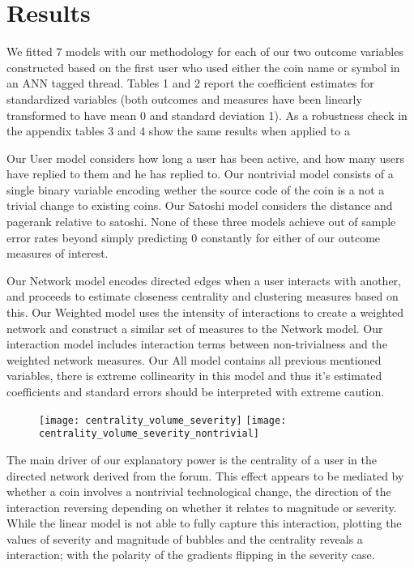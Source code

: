 \section{Results}

We fitted $7$ models with our methodology for each of our two outcome variables constructed based on the first user who used either the coin name or symbol in an ANN tagged thread.
Tables 1 and 2 report the coefficient estimates for standardized variables (both outcomes and measures have been linearly transformed to have mean 0 and standard deviation 1).
As a robustness check in the appendix tables 3 and 4 show the same results when applied to a 

Our User model considers how long a user has been active, and how many users have replied to them and he has replied to. 
Our nontrivial model consists of a single binary variable encoding wether the source code of the coin is a not a trivial change to existing coins. 
Our Satoshi model considers the distance and pagerank relative to satoshi.
None  of these three models achieve out of sample error rates beyond simply predicting $0$ constantly for either of our outcome measures of interest.


Our Network model encodes directed edges when a user interacts with another, and proceeds to estimate closeness centrality and clustering measures based on this. 
Our Weighted model uses the intensity of interactions to create a weighted network and construct a similar set of measures to the Network model.
Our interaction model includes interaction terms between non-trivialness and the weighted network measures.
Our All model contains all previous mentioned variables, there is extreme collinearity in this model and thus it's estimated coefficients and standard errors should be interpreted with extreme caution. 


\begin{figure}[h]
\texttt{[image: centrality\_volume\_severity]}
\texttt{[image: centrality\_volume\_severity\_nontrivial]}
\end{figure}

The main driver of our explanatory power is the centrality of a user in the directed network derived from the forum. 
This effect appears to be mediated by whether a coin involves a nontrivial technological change, the direction of the interaction reversing depending on whether it relates to magnitude or severity.
While the linear model is not able to fully capture this interaction, plotting the values of severity and magnitude of bubbles and the centrality reveals a interaction; with the polarity of the gradients flipping in the severity case.

